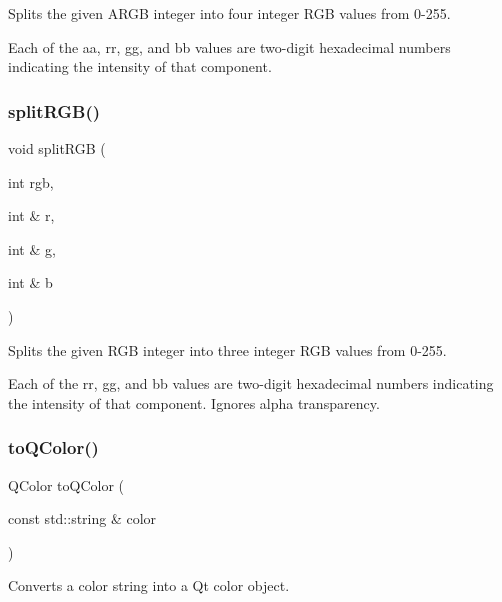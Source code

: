 Splits the given A\+R\+GB integer into four integer R\+GB values from 0-\/255. 

Each of the {\ttfamily aa}, {\ttfamily rr}, {\ttfamily gg}, and {\ttfamily bb} values are two-\/digit hexadecimal numbers indicating the intensity of that component. \mbox{\label{classsgl_1_1GColor_a32dea18e982a160b7b1ce8b4e881c0f9}} 
\subsubsection{\texorpdfstring{split\+R\+G\+B()}{splitRGB()}}
{\footnotesize\ttfamily void split\+R\+GB (\begin{DoxyParamCaption}\item[{int}]{rgb,  }\item[{int \&}]{r,  }\item[{int \&}]{g,  }\item[{int \&}]{b }\end{DoxyParamCaption})\hspace{0.3cm}{\ttfamily [static]}}



Splits the given R\+GB integer into three integer R\+GB values from 0-\/255. 

Each of the {\ttfamily rr}, {\ttfamily gg}, and {\ttfamily bb} values are two-\/digit hexadecimal numbers indicating the intensity of that component. Ignores alpha transparency. \mbox{\label{classsgl_1_1GColor_a23f62da01b905b62266904a01cfb3745}} 
\subsubsection{\texorpdfstring{to\+Q\+Color()}{toQColor()}}
{\footnotesize\ttfamily Q\+Color to\+Q\+Color (\begin{DoxyParamCaption}\item[{const std\+::string \&}]{color }\end{DoxyParamCaption})\hspace{0.3cm}{\ttfamily [static]}}



Converts a color string into a Qt color object. 

